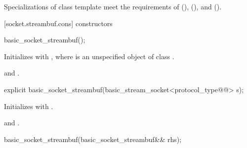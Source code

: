 \pnum
Specializations of class template  meet the requirements of  (),  (), and  ().


[socket.streambuf.cons]{ constructors}

\begin{itemdecl}
basic_socket_streambuf();
\end{itemdecl}

\begin{itemdescr}
\pnum
\effects Initializes  with , where  is an unspecified object of class .

\pnum
\postconditions {} and .

\addedpnum
{}
\end{itemdescr}

\begin{itemdecl}
explicit basic_socket_streambuf(basic_stream_socket<protocol_type@@> s);
\end{itemdecl}

\begin{itemdescr}
\pnum
\effects Initializes  with .

\pnum
\postconditions {} and .
\end{itemdescr}

\begin{itemdecl}
basic_socket_streambuf(basic_socket_streambuf&& rhs);
\end{itemdecl}


